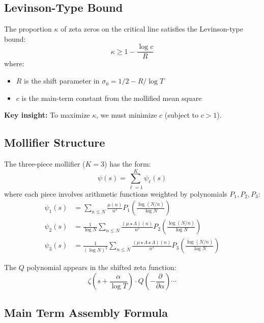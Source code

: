 \documentclass[11pt]{article}
\begin{document}
\subsection{Levinson-Type Bound}

The proportion $\kappa$ of zeta zeros on the critical line satisfies the Levinson-type bound:
\begin{equation}
\boxed{\kappa \geq 1 - \frac{\log c}{R}}
\end{equation}
where:
\begin{itemize}
\item $R$ is the shift parameter in $\sigma_0 = 1/2 - R/\log T$
\item $c$ is the main-term constant from the mollified mean square
\end{itemize}

\textbf{Key insight:} To maximize $\kappa$, we must minimize $c$ (subject to $c > 1$).

\subsection{Mollifier Structure}

The three-piece mollifier ($K=3$) has the form:
\begin{equation}
\psi(s) = \sum_{\ell=1}^{K} \psi_\ell(s)
\end{equation}
where each piece involves arithmetic functions weighted by polynomials $P_1, P_2, P_3$:
\begin{align}
\psi_1(s) &= \sum_{n \leq N} \frac{\mu(n)}{n^s} P_1\left(\frac{\log(N/n)}{\log N}\right) \\
\psi_2(s) &= \frac{1}{\log N} \sum_{n \leq N} \frac{(\mu \star \Lambda)(n)}{n^s} P_2\left(\frac{\log(N/n)}{\log N}\right) \\
\psi_3(s) &= \frac{1}{(\log N)^2} \sum_{n \leq N} \frac{(\mu \star \Lambda \star \Lambda)(n)}{n^s} P_3\left(\frac{\log(N/n)}{\log N}\right)
\end{align}

The $Q$ polynomial appears in the shifted zeta function:
\begin{equation}
\zeta\left(s + \frac{\alpha}{\log T}\right) \cdot Q\left(-\frac{\partial}{\partial \alpha}\right) \cdots
\end{equation}

\subsection{Main Term Assembly Formula}
\end{document}
